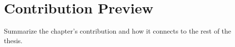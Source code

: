 \section{Contribution Preview}

Summarize the chapter's contribution and how it connects to the rest of the thesis.
